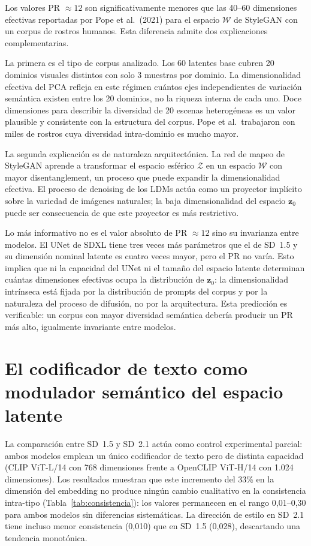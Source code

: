 \documentclass[12pt, a4paper, twoside]{book}
\newcommand{\z}{\mathbf{z}}
\begin{document}
Los valores PR $\approx 12$ son significativamente menores que las 40--60 dimensiones efectivas reportadas por Pope et al.\ (2021) para el espacio $\mathcal{W}$ de StyleGAN con un corpus de rostros humanos. Esta diferencia admite dos explicaciones complementarias.

La primera es el tipo de corpus analizado. Los 60 latentes base cubren 20 dominios visuales distintos con solo 3 muestras por dominio. La dimensionalidad efectiva del PCA refleja en este régimen cuántos ejes independientes de variación semántica existen entre los 20 dominios, no la riqueza interna de cada uno. Doce dimensiones para describir la diversidad de 20 escenas heterogéneas es un valor plausible y consistente con la estructura del corpus. Pope et al.\ trabajaron con miles de rostros cuya diversidad intra-dominio es mucho mayor.

La segunda explicación es de naturaleza arquitectónica. La red de mapeo de StyleGAN aprende a transformar el espacio esférico $\mathcal{Z}$ en un espacio $\mathcal{W}$ con mayor disentanglement, un proceso que puede expandir la dimensionalidad efectiva. El proceso de denoising de los LDMs actúa como un proyector implícito sobre la variedad de imágenes naturales; la baja dimensionalidad del espacio $\z_0$ puede ser consecuencia de que este proyector es más restrictivo.

Lo más informativo no es el valor absoluto de PR $\approx 12$ sino su invarianza entre modelos. El UNet de SDXL tiene tres veces más parámetros que el de SD~1.5 y su dimensión nominal latente es cuatro veces mayor, pero el PR no varía. Esto implica que ni la capacidad del UNet ni el tamaño del espacio latente determinan cuántas dimensiones efectivas ocupa la distribución de $\z_0$: la dimensionalidad intrínseca está fijada por la distribución de prompts del corpus y por la naturaleza del proceso de difusión, no por la arquitectura. Esta predicción es verificable: un corpus con mayor diversidad semántica debería producir un PR más alto, igualmente invariante entre modelos.

\section{El codificador de texto como modulador semántico del espacio latente}
\label{sec:dis:text_encoder}

La comparación entre SD~1.5 y SD~2.1 actúa como control experimental parcial: ambos modelos emplean un único codificador de texto pero de distinta capacidad (CLIP ViT-L/14 con 768 dimensiones frente a OpenCLIP ViT-H/14 con 1.024 dimensiones). Los resultados muestran que este incremento del 33\% en la dimensión del embedding no produce ningún cambio cualitativo en la consistencia intra-tipo (Tabla~\ref{tab:consistencia}): los valores permanecen en el rango 0,01--0,30 para ambos modelos sin diferencias sistemáticas. La dirección de estilo en SD~2.1 tiene incluso menor consistencia (0,010) que en SD~1.5 (0,028), descartando una tendencia monotónica.
\end{document}
